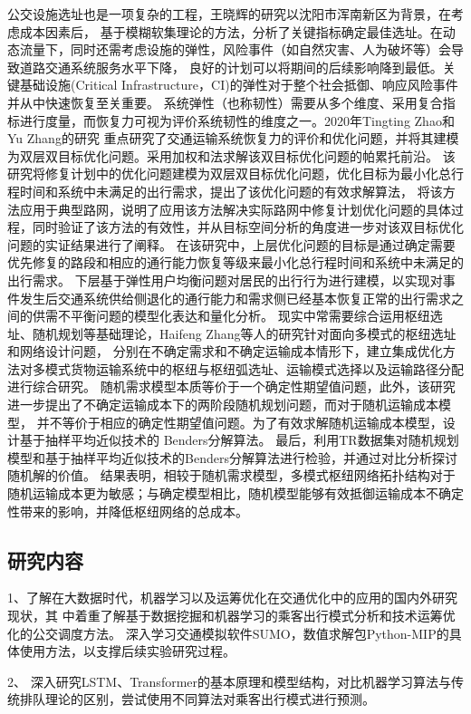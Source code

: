 公交设施选址也是一项复杂的工程，王晓辉的研究\cite{snu2012}以沈阳市浑南新区为背景，在考虑成本因素后，
基于模糊软集理论的方法，分析了关键指标确定最佳选址。在动态流量下，同时还需考虑设施的弹性，风险事件（如自然灾害、人为破坏等）会导致道路交通系统服务水平下降，
良好的计划可以将期间的后续影响降到最低。关键基础设施(Critical Infrastructure，CI)的弹性对于整个社会抵御、响应风险事件并从中快速恢复至关重要。
系统弹性（也称韧性）需要从多个维度、采用复合指标进行度量，而恢复力可视为评价系统韧性的维度之一。2020年Tingting Zhao和Yu Zhang的研究\cite{ZHAO2020102700}
重点研究了交通运输系统恢复力的评价和优化问题，并将其建模为双层双目标优化问题。采用加权和法求解该双目标优化问题的帕累托前沿。
该研究将修复计划中的优化问题建模为双层双目标优化问题，优化目标为最小化总行程时间和系统中未满足的出行需求，提出了该优化问题的有效求解算法，
将该方法应用于典型路网，说明了应用该方法解决实际路网中修复计划优化问题的具体过程，同时验证了该方法的有效性，并从目标空间分析的角度进一步对该双目标优化问题的实证结果进行了阐释。
在该研究中，上层优化问题的目标是通过确定需要优先修复的路段和相应的通行能力恢复等级来最小化总行程时间和系统中未满足的出行需求。
下层基于弹性用户均衡问题对居民的出行行为进行建模，以实现对事件发生后交通系统供给侧退化的通行能力和需求侧已经基本恢复正常的出行需求之间的供需不平衡问题的模型化表达和量化分析。
现实中常需要综合运用枢纽选址、随机规划等基础理论，Haifeng Zhang等人的研究\cite{ZHANG2022108493}针对面向多模式的枢纽选址和网络设计问题，
分别在不确定需求和不确定运输成本情形下，建立集成优化方法对多模式货物运输系统中的枢纽与枢纽弧选址、运输模式选择以及运输路径分配进行综合研究。
随机需求模型本质等价于一个确定性期望值问题，此外，该研究进一步提出了不确定运输成本下的两阶段随机规划问题，而对于随机运输成本模型，
并不等价于相应的确定性期望值问题。为了有效求解随机运输成本模型，设计基于抽样平均近似技术的 Benders分解算法。
最后，利用TR数据集对随机规划模型和基于抽样平均近似技术的Benders分解算法进行检验，并通过对比分析探讨随机解的价值。
结果表明，相较于随机需求模型，多模式枢纽网络拓扑结构对于随机运输成本更为敏感；与确定模型相比，随机模型能够有效抵御运输成本不确定性带来的影响，并降低枢纽网络的总成本。
\subsection{研究内容}
1、了解在大数据时代，机器学习以及运筹优化在交通优化中的应用的国内外研究现状，其
中着重了解基于数据挖掘和机器学习的乘客出行模式分析和技术运筹优化的公交调度方法。
深入学习交通模拟软件SUMO，数值求解包Python-MIP的具体使用方法，以支撑后续实验研究过程。

2、 深入研究LSTM、Transformer的基本原理和模型结构，对比机器学习算法与传统排队理论的区别，尝试使用不同算法对乘客出行模式进行预测。

